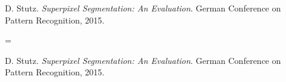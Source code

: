 \documentclass{article}
\begin{document}
\nocite{*}

\begin{thebibliography}{1}
	D. Stutz.
	\emph{Superpixel Segmentation: An Evaluation}.
	German Conference on Pattern Recognition, 2015.
\end{thebibliography}

\patchcmd{\thebibliography}
  {\advance\leftmargin{}}
  {\leftmargin=0pt\itemindent=\advance\itemindent{}}
  {}{}

\begin{thebibliography}{1}
	D. Stutz.
	\emph{Superpixel Segmentation: An Evaluation}.
	German Conference on Pattern Recognition, 2015.
\end{thebibliography}
\end{document}
